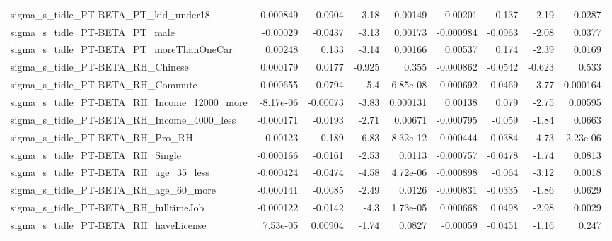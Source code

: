 \begin{tabular}{lrrrrrrrr}
sigma\_s\_tidle\_PT-BETA\_PT\_kid\_under18               &    0.000849 &       0.0904 &     -3.18 &  0.00149 &    0.00201 &       0.137 &        -2.19 &        0.0287 \\
sigma\_s\_tidle\_PT-BETA\_PT\_male                      &    -0.00029 &      -0.0437 &     -3.13 &  0.00173 &  -0.000984 &     -0.0963 &        -2.08 &        0.0377 \\
sigma\_s\_tidle\_PT-BETA\_PT\_moreThanOneCar            &     0.00248 &        0.133 &     -3.14 &  0.00166 &    0.00537 &       0.174 &        -2.39 &        0.0169 \\
sigma\_s\_tidle\_PT-BETA\_RH\_Chinese                   &    0.000179 &       0.0177 &    -0.925 &    0.355 &  -0.000862 &     -0.0542 &       -0.623 &         0.533 \\
sigma\_s\_tidle\_PT-BETA\_RH\_Commute                   &   -0.000655 &      -0.0794 &      -5.4 & 6.85e-08 &   0.000692 &      0.0469 &        -3.77 &      0.000164 \\
sigma\_s\_tidle\_PT-BETA\_RH\_Income\_12000\_more         &   -8.17e-06 &     -0.00073 &     -3.83 & 0.000131 &    0.00138 &       0.079 &        -2.75 &       0.00595 \\
sigma\_s\_tidle\_PT-BETA\_RH\_Income\_4000\_less          &   -0.000171 &      -0.0193 &     -2.71 &  0.00671 &  -0.000795 &      -0.059 &        -1.84 &        0.0663 \\
sigma\_s\_tidle\_PT-BETA\_RH\_Pro\_RH                    &    -0.00123 &       -0.189 &     -6.83 & 8.32e-12 &  -0.000444 &     -0.0384 &        -4.73 &      2.23e-06 \\
sigma\_s\_tidle\_PT-BETA\_RH\_Single                    &   -0.000166 &      -0.0161 &     -2.53 &   0.0113 &  -0.000757 &     -0.0478 &        -1.74 &        0.0813 \\
sigma\_s\_tidle\_PT-BETA\_RH\_age\_35\_less               &   -0.000424 &      -0.0474 &     -4.58 & 4.72e-06 &  -0.000898 &      -0.064 &        -3.12 &        0.0018 \\
sigma\_s\_tidle\_PT-BETA\_RH\_age\_60\_more               &   -0.000141 &      -0.0085 &     -2.49 &   0.0126 &  -0.000831 &     -0.0335 &        -1.86 &        0.0629 \\
sigma\_s\_tidle\_PT-BETA\_RH\_fulltimeJob               &   -0.000122 &      -0.0142 &      -4.3 & 1.73e-05 &   0.000668 &      0.0498 &        -2.98 &        0.0029 \\
sigma\_s\_tidle\_PT-BETA\_RH\_haveLicense               &    7.53e-05 &      0.00904 &     -1.74 &   0.0827 &   -0.00059 &     -0.0451 &        -1.16 &         0.247 \\

\end{tabular}

